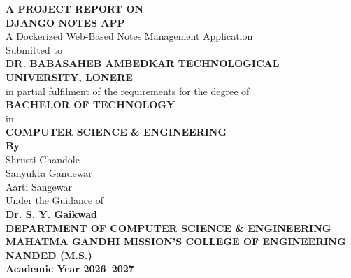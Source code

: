 \documentclass[12pt,a4paper,oneside]{report}
\begin{document}
\begin{titlepage}
\thispagestyle{empty}
\begin{center}
\vspace*{0.45in}
{\Large\bfseries A PROJECT REPORT ON}\\[0.35in]
{\Huge\bfseries\color{mgmpurple} DJANGO NOTES APP}\\[0.18in]
{\large A Dockerized Web-Based Notes Management Application}\\[0.55in]

Submitted to\\[0.12in]
{\large\bfseries DR. BABASAHEB AMBEDKAR TECHNOLOGICAL UNIVERSITY, LONERE}\\[0.25in]
in partial fulfilment of the requirements for the degree of\\[0.2in]
{\Large\bfseries BACHELOR OF TECHNOLOGY}\\[0.08in]
in\\[0.08in]
{\large\bfseries COMPUTER SCIENCE \& ENGINEERING}\\[0.45in]

{\large\bfseries By}\\[0.15in]
{\large Shrusti Chandole}\\
{\large Sanyukta Gandewar}\\
{\large Aarti Sangewar}\\[0.4in]

Under the Guidance of\\[0.12in]
{\large\bfseries Dr. S. Y. Gaikwad}\\[0.45in]

{\bfseries DEPARTMENT OF COMPUTER SCIENCE \& ENGINEERING}\\
{\bfseries MAHATMA GANDHI MISSION'S COLLEGE OF ENGINEERING}\\
{\bfseries NANDED (M.S.)}\\[0.2in]
{\bfseries Academic Year 2026--2027}
\end{center}
\end{titlepage}

\end{document}

